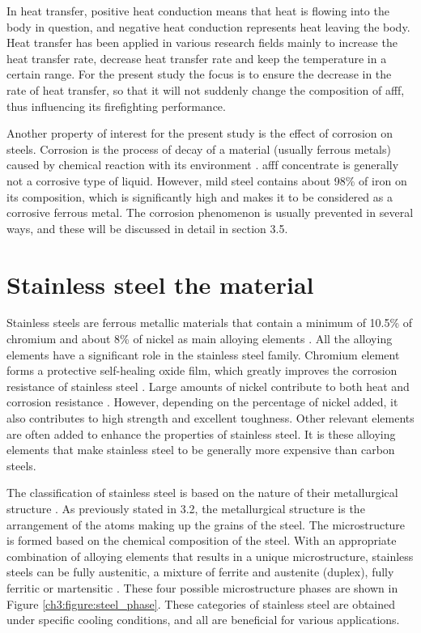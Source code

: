 In heat transfer, positive heat conduction means that heat is flowing into the body in question, and negative heat conduction represents heat leaving the body. Heat transfer has been applied in various research fields mainly to increase the heat transfer rate, decrease heat transfer rate and keep the temperature in a certain range. For the present study the focus is to ensure the decrease in the rate of heat transfer, so that it will not suddenly change the composition of \acrshort{afff}, thus influencing its firefighting performance.  

Another property of interest for the present study is the effect of corrosion on steels. Corrosion is the process of decay of a material (usually ferrous metals) caused by chemical reaction with its environment \cite{islam2018effects}. \acrshort{afff} concentrate is generally not a corrosive type of liquid. However, mild steel contains about 98\% of iron on its composition, which is significantly high and makes it to be considered as a corrosive ferrous metal.  The corrosion phenomenon is usually prevented in several ways, and these will be discussed in detail in section 3.5.

\section{Stainless steel the material} 
Stainless steels are ferrous metallic materials that contain a minimum of 10.5\% of chromium and about 8\% of nickel as main alloying elements \cite{sourmail2005stainless}. All the alloying elements have a significant role in the stainless steel family. Chromium element forms a protective self-healing oxide film, which greatly improves the corrosion resistance of stainless steel \cite{molabe2018determining}. Large amounts of nickel contribute to both heat and corrosion resistance \cite{george2002introduction}. However, depending on the percentage of nickel added, it also contributes to high strength and excellent toughness. Other relevant elements are often added to enhance the properties of stainless steel. It is these alloying elements that make stainless steel to be generally more expensive than carbon steels.

The classification of stainless steel is based on the nature of their metallurgical structure \cite{bhadeshia2017steels}. As previously stated in 3.2, the metallurgical structure is the arrangement of the atoms making up the grains of the steel. The microstructure is formed based on the chemical composition of the steel. With an appropriate combination of alloying elements that results in a unique microstructure, stainless steels can be fully austenitic, a mixture of ferrite and austenite (duplex), fully ferritic or martensitic \cite{bhadeshia2017steels}. These four possible microstructure phases are shown in Figure \ref{ch3:figure:steel_phase}. These categories of stainless steel are obtained under specific cooling conditions, and all are beneficial for various applications.
 

